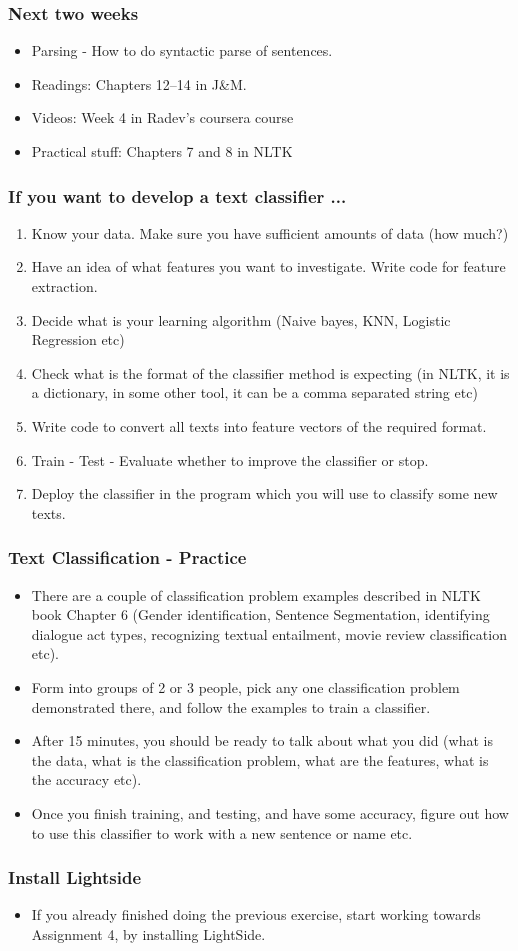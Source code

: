 \documentclass{beamer}
\begin{document}
\begin{frame}
\frametitle{Next two weeks}
\begin{itemize}
\item Parsing - How to do syntactic parse of sentences.
\item Readings: Chapters 12--14 in J\&M.  
\item Videos: Week 4 in Radev's coursera course
\item Practical stuff: Chapters 7 and 8 in NLTK
\end{itemize}
\end{frame}

\begin{frame}
\frametitle{If you want to develop a text classifier ...}
\begin{enumerate}
\item Know your data. Make sure you have sufficient amounts of data (how much?) \pause
\item Have an idea of what features you want to investigate. Write code for feature extraction.
\item Decide what is your learning algorithm (Naive bayes, KNN, Logistic Regression etc)
\item Check what is the format of the classifier method is expecting (in NLTK, it is a dictionary, in some other tool, it can be a comma separated string etc)
\item Write code to convert all texts into feature vectors of the required format.
\item Train - Test - Evaluate whether to improve the classifier or stop.
\item Deploy the classifier in the program which you will use to classify some new texts. 
\end{enumerate}
\end{frame}

\begin{frame}
\frametitle{Text Classification - Practice}
\begin{itemize}
\item There are a couple of classification problem examples described in NLTK book Chapter 6 (Gender identification, Sentence Segmentation, identifying dialogue act types, recognizing textual entailment, movie review classification etc).
\item Form into groups of 2 or 3 people, pick any one classification problem demonstrated there, and follow the examples to train a classifier.
\item After 15 minutes, you should be ready to talk about what you did (what is the data, what is the classification problem, what are the features, what is the accuracy etc). \pause
\item Once you finish training, and testing, and have some accuracy, figure out how to use this classifier to work with a new sentence or name etc.
\end{itemize}
\end{frame}

\begin{frame}
\frametitle{Install Lightside}
\begin{itemize}
\item If you already finished doing the previous exercise, start working towards Assignment 4, by installing LightSide.
\end{itemize}
\end{frame}
\end{document}
